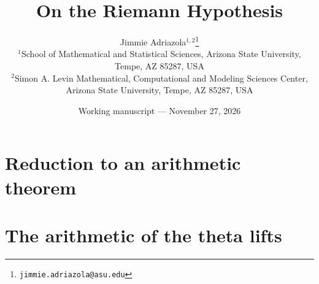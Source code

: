\documentclass[11pt,letterpaper]{article}
\title{\bfseries On the Riemann Hypothesis}
\author{Jimmie Adriazola$^{1,2}$\thanks{\texttt{jimmie.adriazola@asu.edu}}\\[6pt]
\small $^1$School of Mathematical and Statistical Sciences, Arizona State University,\\[-2pt]
\small Tempe, AZ 85287, USA\\[3pt]
\small $^2$Simon A. Levin Mathematical, Computational and Modeling Sciences Center,\\[-2pt]
\small Arizona State University, Tempe, AZ 85287, USA}
\date{\small Working manuscript --- November 27, 2026}
\theoremstyle{plain}
\theoremstyle{definition}
\theoremstyle{remark}
\numberwithin{equation}{section}
\begin{document}
\maketitle

\clearpage
\tableofcontents
\clearpage



\clearpage
\part{Reduction to an arithmetic theorem}






\clearpage
\part{The arithmetic of the theta lifts}
















\end{document}

